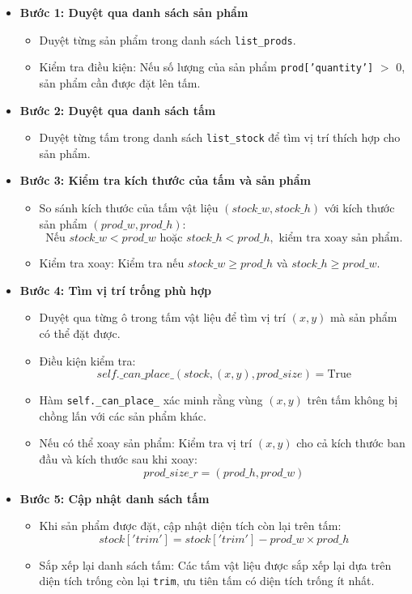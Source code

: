 \documentclass[a4paper]{article}
\begin{document}
\begin{itemize}
  \item \textbf{Bước 1: Duyệt qua danh sách sản phẩm}
  \begin{itemize}
    \item Duyệt từng sản phẩm trong danh sách \texttt{list\_prods}.
    \item Kiểm tra điều kiện: Nếu số lượng của sản phẩm \texttt{prod['quantity']} $>$ 0, sản phẩm cần được đặt lên tấm.
  \end{itemize}

  \item \textbf{Bước 2: Duyệt qua danh sách tấm}
  \begin{itemize}
    \item Duyệt từng tấm trong danh sách \texttt{list\_stock} để tìm vị trí thích hợp cho sản phẩm.
  \end{itemize}

  \item \textbf{Bước 3: Kiểm tra kích thước của tấm và sản phẩm}
  \begin{itemize}
    \item So sánh kích thước của tấm vật liệu $(stock\_w, stock\_h)$ với kích thước sản phẩm $(prod\_w, prod\_h)$:
    \[
    \text{Nếu } stock\_w < prod\_w \text{ hoặc } stock\_h < prod\_h, \text{ kiểm tra xoay sản phẩm.}
    \]
    \item Kiểm tra xoay: Kiểm tra nếu $stock\_w \geq prod\_h$ và $stock\_h \geq prod\_w$.
  \end{itemize}

  \item \textbf{Bước 4: Tìm vị trí trống phù hợp}
  \begin{itemize}
    \item Duyệt qua từng ô trong tấm vật liệu để tìm vị trí $(x, y)$ mà sản phẩm có thể đặt được.
    \item Điều kiện kiểm tra:
    \[
    self.\_can\_place\_(stock, (x, y), prod\_size) = \text{True}
    \]
    \item Hàm \texttt{self.\_can\_place\_} xác minh rằng vùng $(x, y)$ trên tấm không bị chồng lấn với các sản phẩm khác.
    \item Nếu có thể xoay sản phẩm: Kiểm tra vị trí $(x, y)$ cho cả kích thước ban đầu và kích thước sau khi xoay:
    \[
    prod\_size\_r = (prod\_h, prod\_w)
    \]
  \end{itemize}

  \item \textbf{Bước 5: Cập nhật danh sách tấm}
  \begin{itemize}
    \item Khi sản phẩm được đặt, cập nhật diện tích còn lại trên tấm:
    \[
    stock['trim'] = stock['trim'] - prod\_w \times prod\_h
    \]
    \item Sắp xếp lại danh sách tấm: Các tấm vật liệu được sắp xếp lại dựa trên diện tích trống còn lại \texttt{trim}, ưu tiên tấm có diện tích trống ít nhất.
  \end{itemize}


\end{itemize}
\end{document}
